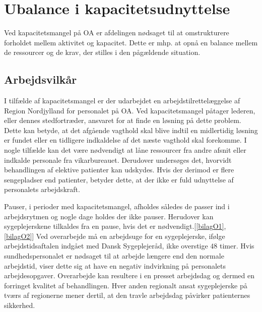 \section{Ubalance i kapacitetsudnyttelse}
Ved kapacitetsmangel på OA er afdelingen nødsaget til at omstrukturere forholdet mellem aktivitet og kapacitet. Dette er mhp. at opnå en balance mellem de ressourcer og de krav, der stilles i den pågældende situation.\cite{Bjerg2016} %

\subsection{Arbejdsvilkår} \label{Per_sik}

I tilfælde af kapacitetsmangel er der udarbejdet en arbejdstilrettelæggelse af Region Nordjylland for personalet på OA. Ved kapacitetsmangel påtager lederen, eller dennes stedfortræder, ansvaret for at finde en løsning på dette problem. Dette kan betyde, at det afgående vagthold skal blive indtil en midlertidig løsning er fundet eller en tidligere indkaldelse af det næste vagthold skal forekomme. I nogle tilfælde kan det være nødvendigt at låne ressourcer fra andre afsnit eller indkalde personale fra vikarbureauet. Derudover undersøges det, hvorvidt behandlingen af elektive patienter kan udskydes.\cite{Bjerg2016} 
Hvis der derimod er flere sengepladser end patienter, betyder dette, at der ikke er fuld udnyttelse af personalets arbejdskraft.

Pauser, i perioder med kapacitetsmangel, afholdes således de passer ind i arbejdsrytmen og nogle dage holdes der ikke pauser. Herudover kan sygeplejerskene tilkaldes fra en pause, hvis det er nødvendigt.[\ref{bilagO1}, \ref{bilagO2}] Ved overarbejde må en arbejdsuge for en sygeplejerske, ifølge arbejdstidsaftalen indgået med Dansk Sygeplejeråd, ikke overstige $48$ timer. Hvis sundhedspersonalet er nødsaget til at arbejde længere end den normale arbejdstid, viser dette sig at have en negativ indvirkning på personalets arbejdesopgaver\cite{Dinges2004}. Overarbejde kan resultere i en presset arbejdsdag og dermed en forringet kvalitet af behandlingen. Hver anden regionalt ansat sygeplejerske på tværs af regionerne mener dertil, at den travle arbejdsdag påvirker patienternes sikkerhed.\cite{Kjeldsen2015}


